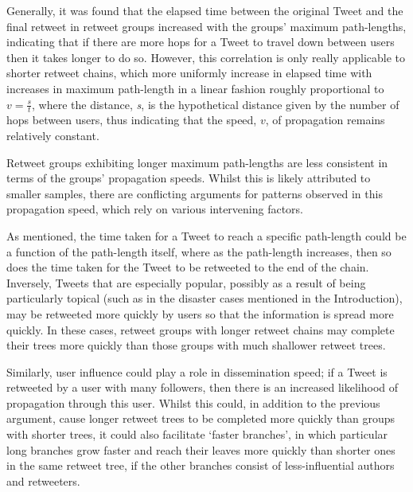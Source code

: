
Generally, it was found that the elapsed time between the original Tweet and the final retweet in retweet groups increased with the groups' maximum path-lengths, indicating that if there are more hops for a Tweet to travel down between users then it takes longer to do so. However, this correlation is only really applicable to shorter retweet chains, which more uniformly increase in elapsed time with increases in maximum path-length in a linear fashion roughly proportional to $ v=\frac{s}{t} $, where the distance, \textit{s}, is the hypothetical distance given by the number of hops between users, thus indicating that the speed, $v$, of propagation remains relatively constant. 

Retweet groups exhibiting longer maximum path-lengths are less consistent in terms of the groups' propagation speeds. Whilst this is likely attributed to smaller samples, there are conflicting arguments for patterns observed in this propagation speed, which rely on various intervening factors. 

As mentioned, the time taken for a Tweet to reach a specific path-length could be a function of the path-length itself, where as the path-length increases, then so does the time taken for the Tweet to be retweeted to the end of the chain. Inversely, Tweets that are especially popular, possibly as a result of being particularly topical (such as in the disaster cases mentioned in the Introduction), may be retweeted more quickly by users so that the information is spread more quickly. In these cases, retweet groups with longer retweet chains may complete their trees more quickly than those groups with much shallower retweet trees.

Similarly, user influence could play a role in dissemination speed; if a Tweet is retweeted by a user with many followers, then there is an increased likelihood of propagation through this user. Whilst this could, in addition to the previous argument, cause longer retweet trees to be completed more quickly than groups with shorter trees, it could also facilitate `faster branches', in which particular long branches grow faster and reach their leaves more quickly than shorter ones in the same retweet tree, if the other branches consist of less-influential authors and retweeters.

